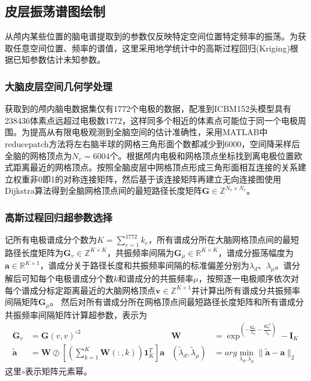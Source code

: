 \subsection{皮层振荡谱图绘制}\label{ch:kriging}
从颅内某些位置的脑电谱提取到的参数仅反映特定空间位置特定频率的振荡。为获取任意空间位置、频率的谱值，这里采用地学统计中的高斯过程回归(Kriging)根据已知参数估计未知参数。

\subsubsection{大脑皮层空间几何学处理}
获取到的颅内脑电数据集仅有1772个电极的数据，配准到ICBM152头模型具有238436体素点远超过电极数1772，这样同多个相近的体素点可能位于同一个电极周围。为提高从有限电极观测到全脑空间的估计准确性，采用MATLAB中reducepatch方法将左右脑半球的网格三角形面个数都减少到6000，空间降采样后全脑的网格顶点为$N_v=6004$个。根据颅内电极和网格顶点坐标找到离电极位置欧式距离最近的网格顶点。按照全脑皮层中网格顶点形成三角形面相互连接的关系建立权重非0即1的对称连接矩阵，然后基于该连接矩阵再建立无向连接图使用Dijkstra算法得到全脑网格顶点间的最短路径长度矩阵$\mathbf{G}\in{\mathbb{Z}^{N_v\times{N_v}}}$。

\subsubsection{高斯过程回归超参数选择}
记所有电极谱成分个数为$K=\sum_{e=1}^{1772}k_e$，所有谱成分所在大脑网格顶点间的最短路径长度矩阵为$\mathbf{G}_v\in{\mathbb{Z}^{K\times{K}}}$，共振频率间隔为$\mathbf{G}_\mu\in{\mathbb{R}^{K\times{K}}}$，谱成分振荡幅度为$\mathbf{a}\in{\mathbb{R}^{K\times1}}$，谱成分关于路径长度和共振频率间隔的标准偏差分别为$\lambda_d$、$\lambda_\mu$。谱分解后可知每个电极谱成分个数$k$和谱成分的共振频率$\mu$，按照逐一电极顺序依次对每个谱成分标定距离最近的大脑网格顶点$\mathbf{v}\in{\mathbb{Z}^{K\times1}}$并计算出所有谱成分共振频率间隔矩阵$\mathbf{G}_\mu$。 然后对所有谱成分所在网格顶点间最短路径长度矩阵和所有谱成分共振频率间隔矩阵计算超参数，表示为
\begin{equation}\label{eq7.15}
\begin{aligned}
\mathbf{G}_v& = \mathbf{G}(v,v)^{\circ2}& 
\mathbf{W}& =\exp^{(-\frac{\mathbf{G}_v}{\lambda_d}-\frac{\mathbf{G}_\mu^{\circ2}}{\lambda_\mu})}-\mathbf{I}_K\\
\tilde{\mathbf{a}}& =\mathbf{W}\oslash[(\sum_{k=1}^K\mathbf{W}(:,k))\mathbf{1}_K^T]\mathbf{a}&
(\tilde{\lambda}_d,\tilde{\lambda}_\mu)& =arg\min_{\lambda_d,\lambda_\mu}\lVert\tilde{\mathbf{a}}-\mathbf{a}\rVert_2
\end{aligned}
\end{equation}
这里$\circ$表示矩阵元素幂。

